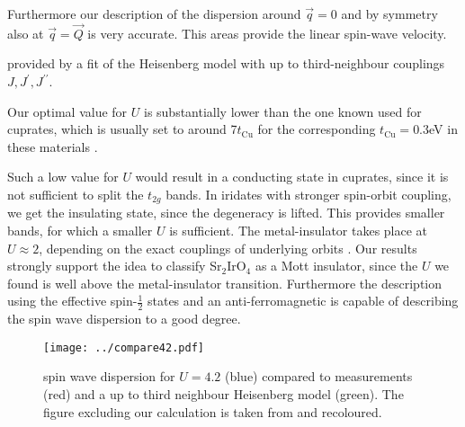 \documentclass[a4paper,12pt]{report}
\begin{document}
Furthermore our description of the dispersion around $\vec q = 0$ and by symmetry also at $\vec q = \vec Q$ is very accurate.
This areas provide the linear spin-wave velocity. 

provided by a fit of the Heisenberg model with up to third-neighbour couplings $J,J^{\prime},J^{\prime \prime}$. 

Our optimal value for $U$ is substantially lower than the one known used for cuprates, 
which is usually set to around 7$t_{\mathrm{Cu}}$ for the corresponding $t_{\mathrm{Cu}}=0.3$eV in these materials \cite{PhysRevB.65.132404}. 

Such a low value for $U$ would result in a conducting state in cuprates, since it is not sufficient to split the $t_{2g}$ bands. 
In iridates with stronger spin-orbit coupling, we get the insulating state, since the degeneracy is lifted.
This provides smaller bands, for which a smaller $U$ is sufficient.
The metal-insulator takes place at $U \approx 2$, depending on the exact couplings of underlying orbits \cite{PhysRevB.88.035111}.
Our results strongly support the idea to classify Sr$_2$IrO$_4$ as a Mott insulator, since the $U$ we found is well above the metal-insulator
transition. 
Furthermore the description using the effective spin-$\frac12$ states and an anti-ferromagnetic is capable of describing the 
spin wave dispersion to a good degree. 
\begin{figure}
 \begin{center}
  \texttt{[image: ../compare42.pdf]}
 \caption{ spin wave dispersion for $U=4.2$ (blue) compared to measurements (red) and a up to third neighbour Heisenberg model (green). 
 The figure excluding our calculation is taken from \cite{PhysRevLett.108.177003} and recoloured.} 
 \end{center}
\label{tttU42}
\end{figure}
\end{document}
